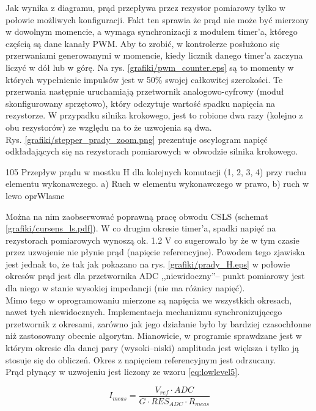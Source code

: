 Jak wynika z diagramu, prąd przepływa przez rezystor pomiarowy tylko w połowie możliwych konfiguracji. Fakt ten sprawia że prąd nie może być mierzony w dowolnym momencie, a wymaga synchronizacji z modułem timer'a, którego częścią są dane kanały PWM. Aby to zrobić, w kontrolerze posłużono się przerwaniami generowanymi w momencie, kiedy licznik danego timer'a zaczyna liczyć w dół lub w górę. Na rys. \ref{grafiki/pwm_counter.eps} są to momenty w których wypełnienie impulsów jest w 50\% swojej całkowitej szerokości. Te przerwania następnie uruchamiają przetwornik analogowo-cyfrowy (moduł skonfigurowany sprzętowo), który odczytuje wartość spadku napięcia na rezystorze. W przypadku silnika krokowego, jest to robione dwa razy (kolejno z obu rezystorów) ze względu na to że uzwojenia są dwa. \\

Rys. \ref{grafiki/stepper_prady_zoom.png} prezentuje oscylogram napięć odkładających się na rezystorach pomiarowych w obwodzie silnika krokowego.

	{105}
	{Przepływ prądu w mostku H dla kolejnych komutacji (1, 2, 3, 4) przy ruchu elementu wykonawczego. a) Ruch w elementu wykonawczego w prawo, b) ruch w lewo}
	{oprWlasne}
	
Można na nim zaobserwować poprawną pracę obwodu CSLS (schemat \ref{grafiki/cursens_ls.pdf}). W co drugim okresie timer'a, spadki napięć na rezystorach pomiarowych wynoszą ok. 1.2 V co sugerowało by że w tym czasie przez uzwojenie nie płynie prąd (napięcie referencyjne). Powodem tego zjawiska jest jednak to, że tak jak pokazano na rys. \ref{grafiki/prady_H.eps} w połowie okresów prąd jest dla przetwornika ADC ,,niewidoczny''-- punkt pomiarowy jest dla niego w stanie wysokiej impedancji (nie ma różnicy napięć). \\

Mimo tego w oprogramowaniu mierzone są napięcia we wszystkich okresach, nawet tych niewidocznych. Implementacja mechanizmu synchronizującego przetwornik z okresami, zarówno jak jego działanie było by bardziej czasochłonne niż zastosowany obecnie algorytm. Mianowicie, w programie sprawdzane jest w którym okresie dla danej pary (wysoki--niski) amplituda jest większa i tylko ją stosuje się do obliczeń. Okres z napięciem referencyjnym jest odrzucany. \\

Prąd płynący w uzwojeniu jest liczony ze wzoru \ref{eq:lowlevel5}.

\begin{equation} \label{eq:lowlevel5}
	I_{meas} = \frac{V_{ref} \cdot ADC}{G \cdot RES_{ADC} \cdot R_{meas}}
\end{equation}

